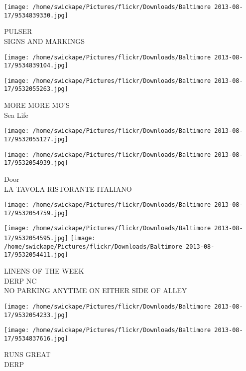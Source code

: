 \documentclass[10pt,letterpaper]{article}
\begin{document}
\vspace{0.25in}
\texttt{[image: /home/swickape/Pictures/flickr/Downloads/Baltimore 2013-08-17/9534839330.jpg]}

PULSER\\
SIGNS AND MARKINGS\\
\pagebreak

\texttt{[image: /home/swickape/Pictures/flickr/Downloads/Baltimore 2013-08-17/9534839104.jpg]}

\vspace{0.25in}
\texttt{[image: /home/swickape/Pictures/flickr/Downloads/Baltimore 2013-08-17/9532055263.jpg]}

MORE MORE MO'S\\
Sea Life\\
\pagebreak

\texttt{[image: /home/swickape/Pictures/flickr/Downloads/Baltimore 2013-08-17/9532055127.jpg]}

\vspace{0.25in}
\texttt{[image: /home/swickape/Pictures/flickr/Downloads/Baltimore 2013-08-17/9532054939.jpg]}

Door\\
LA TAVOLA RISTORANTE ITALIANO\\
\pagebreak

\texttt{[image: /home/swickape/Pictures/flickr/Downloads/Baltimore 2013-08-17/9532054759.jpg]}

\vspace{0.25in}
\texttt{[image: /home/swickape/Pictures/flickr/Downloads/Baltimore 2013-08-17/9532054595.jpg]}
\texttt{[image: /home/swickape/Pictures/flickr/Downloads/Baltimore 2013-08-17/9532054411.jpg]}

LINENS OF THE WEEK\\
DERP NC\\
NO PARKING ANYTIME ON EITHER SIDE OF ALLEY\\
\pagebreak

\texttt{[image: /home/swickape/Pictures/flickr/Downloads/Baltimore 2013-08-17/9532054233.jpg]}

\vspace{0.25in}
\texttt{[image: /home/swickape/Pictures/flickr/Downloads/Baltimore 2013-08-17/9534837616.jpg]}

RUNS GREAT\\
DERP\\
\pagebreak
\end{document}
